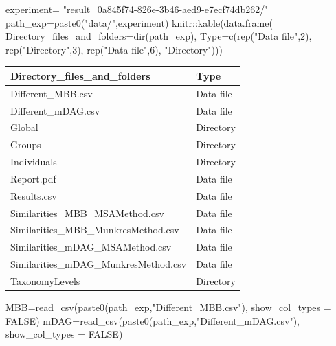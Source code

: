 \documentclass[
  letterpaper,
  DIV=11,
  numbers=noendperiod]{scrreprt}
\newenvironment{Shaded}{}{}
\newcommand{\AttributeTok}[1]{\textcolor[rgb]{0.78,0.47,0.87}{#1}}
\newcommand{\ConstantTok}[1]{\textcolor[rgb]{0.82,0.60,0.40}{#1}}
\newcommand{\DecValTok}[1]{\textcolor[rgb]{0.82,0.60,0.40}{#1}}
\newcommand{\FunctionTok}[1]{\textcolor[rgb]{0.38,0.69,0.94}{#1}}
\newcommand{\NormalTok}[1]{\textcolor[rgb]{0.67,0.70,0.75}{#1}}
\newcommand{\OtherTok}[1]{\textcolor[rgb]{0.15,0.68,0.38}{#1}}
\newcommand{\SpecialCharTok}[1]{\textcolor[rgb]{0.34,0.71,0.76}{#1}}
\newcommand{\StringTok}[1]{\textcolor[rgb]{0.60,0.76,0.47}{#1}}
\begin{document}
\begin{Shaded}
\begin{Highlighting}[]
\NormalTok{experiment}\OtherTok{=}
  \StringTok{"result\_0a845f74{-}826e{-}3b46{-}aed9{-}e7ecf74db262/"}
\NormalTok{path\_exp}\OtherTok{=}\FunctionTok{paste0}\NormalTok{(}\StringTok{"data/"}\NormalTok{,experiment)}
\NormalTok{knitr}\SpecialCharTok{::}\FunctionTok{kable}\NormalTok{(}\FunctionTok{data.frame}\NormalTok{(}
  \AttributeTok{Directory\_files\_and\_folders=}\FunctionTok{dir}\NormalTok{(path\_exp),}
  \AttributeTok{Type=}\FunctionTok{c}\NormalTok{(}\FunctionTok{rep}\NormalTok{(}\StringTok{"Data file"}\NormalTok{,}\DecValTok{2}\NormalTok{),}
  \FunctionTok{rep}\NormalTok{(}\StringTok{"Directory"}\NormalTok{,}\DecValTok{3}\NormalTok{),}
  \FunctionTok{rep}\NormalTok{(}\StringTok{"Data file"}\NormalTok{,}\DecValTok{6}\NormalTok{),}
  \StringTok{"Directory"}\NormalTok{)))}
\end{Highlighting}
\end{Shaded}

\begin{tabular}{l|l}
\hline
Directory\_files\_and\_folders & Type\\
\hline
Different\_MBB.csv & Data file\\
\hline
Different\_mDAG.csv & Data file\\
\hline
Global & Directory\\
\hline
Groups & Directory\\
\hline
Individuals & Directory\\
\hline
Report.pdf & Data file\\
\hline
Results.csv & Data file\\
\hline
Similarities\_MBB\_MSAMethod.csv & Data file\\
\hline
Similarities\_MBB\_MunkresMethod.csv & Data file\\
\hline
Similarities\_mDAG\_MSAMethod.csv & Data file\\
\hline
Similarities\_mDAG\_MunkresMethod.csv & Data file\\
\hline
TaxonomyLevels & Directory\\
\hline
\end{tabular}

\begin{Shaded}
\begin{Highlighting}[]
\NormalTok{MBB}\OtherTok{=}\FunctionTok{read\_csv}\NormalTok{(}\FunctionTok{paste0}\NormalTok{(path\_exp,}\StringTok{"Different\_MBB.csv"}\NormalTok{),}
             \AttributeTok{show\_col\_types =} \ConstantTok{FALSE}\NormalTok{)}
\NormalTok{mDAG}\OtherTok{=}\FunctionTok{read\_csv}\NormalTok{(}\FunctionTok{paste0}\NormalTok{(path\_exp,}\StringTok{"Different\_mDAG.csv"}\NormalTok{),}
              \AttributeTok{show\_col\_types =} \ConstantTok{FALSE}\NormalTok{)}
\end{Highlighting}
\end{Shaded}
\end{document}
